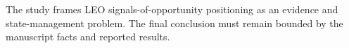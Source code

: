 The study frames LEO signals-of-opportunity positioning as an evidence and state-management problem. The final conclusion must remain bounded by the manuscript facts and reported results.
